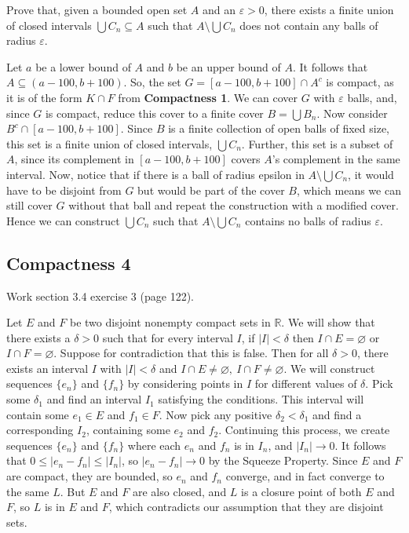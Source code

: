 \documentclass[11pt]{article}
\newcommand{\R}{\mathbb{R}}
\begin{document}
Prove that, given a bounded open set $A$ and an $\varepsilon > 0$,
there exists a finite union of closed intervals $\bigcup C_n \subseteq A$
such that $A\setminus\bigcup C_n$ does not contain any balls of radius
$\varepsilon$.

Let $a$ be a lower bound of $A$ and $b$ be an upper bound of $A$. It follows
that $A\subseteq(a-100,b+100)$. So, the set $G=[a-100,b+100]\cap A^c$
is compact, as it is of the form $K\cap F$ from \textbf{Compactness 1}.
We can cover $G$ with $\varepsilon$ balls, and, since $G$ is compact,
reduce this cover to a finite cover $B=\bigcup B_n$. Now consider
$B^c\cap[a-100,b+100]$. Since $B$ is a finite collection of open balls
of fixed size, this set is a finite union of closed intervals,
$\bigcup C_n$. Further, this set is a subset of $A$, since its complement
in $[a-100,b+100]$ covers $A$'s complement in the same interval.
Now, notice that if there is a ball of radius epsilon in
$A\setminus \bigcup C_n$, it would have to be disjoint from $G$ but would
be part of the cover $B$, which means we can still cover $G$ without that ball
and repeat the construction with a modified cover.
Hence we can construct $\bigcup C_n$ such that $A\setminus\bigcup C_n$
contains no balls of radius $\varepsilon$.

\subsection*{Compactness 4}

Work section 3.4 exercise 3 (page 122). 

Let $E$ and $F$ be two disjoint nonempty compact sets in $\R$. We will show
that there exists a $\delta>0$ such that for every interval $I$, if
$|I|<\delta$ then $I\cap E = \varnothing$ or $I\cap F=\varnothing$.
Suppose for contradiction that this is false. Then for all $\delta>0$,
there exists an interval $I$ with $|I|<\delta$ and $I\cap E\neq \varnothing,\
I\cap F\neq \varnothing$. We will construct sequences $\{e_n\}$ and
$\{f_n\}$ by considering points in $I$ for different values of $\delta$.
Pick some $\delta_1$ and find an interval $I_1$ satisfying the conditions.
This interval will contain some $e_1\in E$ and $f_1\in F$. Now pick any
positive $\delta_2<\delta_1$ and find a corresponding $I_2$, containing
some $e_2$ and $f_2$. Continuing this process, we create sequences 
$\{e_n\}$ and $\{f_n\}$ where each $e_n$ and $f_n$ is in $I_n$, and
$|I_n|\to0$. It follows that $0\leq|e_n-f_n|\leq|I_n|$, so $|e_n-f_n|\to0$ by
the Squeeze Property. Since $E$ and $F$ are compact, they are bounded, so
$e_n$ and $f_n$ converge, and in fact converge to the same $L$. But $E$ and 
$F$ are also closed, and $L$ is a closure point of both $E$ and $F$, so
$L$ is in $E$ and $F$, which contradicts our assumption that they are
disjoint sets.
\end{document}
